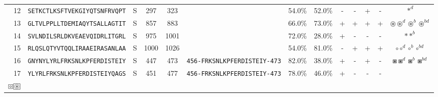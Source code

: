 \begin{tabular}{rcccccccccccc}
12 &  \texttt{SETKCTLKSFTVEKGIYQTSNFRVQPT} &       S &    297 &   323 &                                                                  &                          54.0\% &                           52.0\% &          - &           - &          + &           - &                                                                                                                                     $ \ast^d $ \\
13 &  \texttt{GLTVLPPLLTDEMIAQYTSALLAGTIT} &       S &    857 &   883 &                                                                  &                          66.0\% &                           73.0\% &          + &           + &          + &           + &                                                                                   $ \circledast \circledast^d \circledast^b \circledast^{bd} $ \\
14 &  \texttt{SVLNDILSRLDKVEAEVQIDRLITGRL} &       S &    975 &  1001 &                                                                  &                          72.0\% &                           28.0\% &          + &           - &          - &           - &                                                                                                                                $ \ast \ast^b $ \\
15 &  \texttt{RLQSLQTYVTQQLIRAAEIRASANLAA} &       S &   1000 &  1026 &                                                                  &                          54.0\% &                           81.0\% &          - &           + &          + &           + &                                                                                                           $ \circ \circ^d \circ^b \circ^{bd} $ \\
16 &  \texttt{GNYNYLYRLFRKSNLKPFERDISTEIY} &       S &    447 &   473 &  \texttt{{\scriptsize 456-}FRKSNLKPFERDISTEIY{\scriptsize -473}} &                          82.0\% &                           38.0\% &          + &           - &          + &           - &                                                                                                   $ \boxast \boxast^d \boxast^b \boxast^{bd} $ \\
17 &  \texttt{YLYRLFRKSNLKPFERDISTEIYQAGS} &       S &    451 &   477 &  \texttt{{\scriptsize 456-}FRKSNLKPFERDISTEIY{\scriptsize -473}} &                          78.0\% &                           46.0\% &          + &           - &          - &           - &           \Centerstack{  $\boxempty \boxempty^b \boxempty^d \boxempty^{bd}$ \\  $\boxcircle \setlength{\fboxsep}{0.5pt} \boxed{\circledast}$ } \\

\end{tabular}
